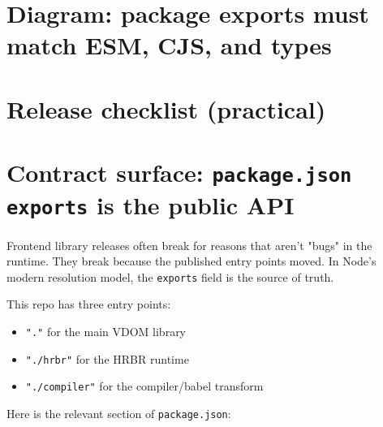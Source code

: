 \section*{Diagram: package exports must match ESM, CJS, and types}
\begin{center}
\end{center}

\section{Release checklist (practical)}

\section{Contract surface: \texttt{package.json exports} is the public API}

Frontend library releases often break for reasons that aren't "bugs" in the runtime.
They break because the published entry points moved.
In Node's modern resolution model, the \texttt{exports} field is the source of truth.

This repo has three entry points:

\begin{itemize}
\item \texttt{"."} for the main VDOM library
\item \texttt{"./hrbr"} for the HRBR runtime
\item \texttt{"./compiler"} for the compiler/babel transform
\end{itemize}

Here is the relevant section of \texttt{package.json}:

